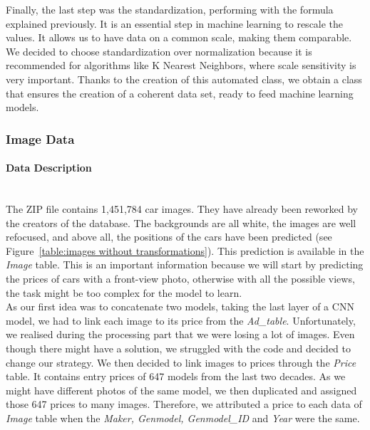 \documentclass[12pt]{article}
\begin{document}
\noindent Finally, the last step was the standardization, performing with the formula explained previously. It is an essential step in machine learning to rescale the values. It allows us to have data on a common scale, making them comparable. We decided to choose standardization over normalization because it is recommended for algorithms like K Nearest Neighbors, where scale sensitivity is very important. Thanks to the creation of this automated class, we obtain a class that ensures the creation of a coherent data set, ready to feed machine learning models. \\



\subsubsection{Image Data}

\paragraph{Data Description}
~~\\ [0.1 cm]

\noindent The ZIP file contains 1,451,784 car images. They have already been reworked by the creators of the database. The backgrounds are all white, the images are well refocused, and above all, the positions of the cars have been predicted (see Figure~\ref{table:images without transformations}). This prediction is available in the \textit{Image} table. This is an important information because we will start by predicting the prices of cars with a front-view photo, otherwise with all the possible views, the task might be too complex for the model to learn.\\

\noindent As our first idea was to concatenate two models, taking the last layer of a CNN model, we had to link each image to its price from the \textit{Ad\_table}. Unfortunately, we realised during the processing part that we were losing a lot of images. Even though there might have a solution, we struggled with the code and decided to change our strategy. We then decided to link images to prices through the \textit{Price} table. It contains entry prices of 647 models from the last two decades. 
As we might have different photos of the same model, we then duplicated and assigned those 647 prices to many images. Therefore, we attributed a price to each data of \textit{Image} table when the \textit{Maker, Genmodel, Genmodel\_ID} and \textit{Year} were the same.\\
\end{document}
